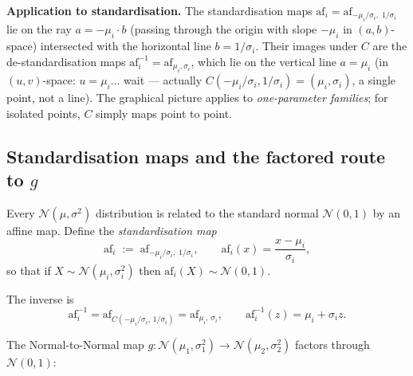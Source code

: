 \documentclass[11pt,a4paper]{article}
\newcommand{\N}{\mathcal{N}}
\begin{document}
\noindent\textbf{Application to standardisation.}
The standardisation maps $\mathrm{af}_i = \mathrm{af}_{-\mu_i/\sigma_i,\;1/\sigma_i}$ lie
on the ray $a = -\mu_i \cdot b$ (passing through the origin with slope $-\mu_i$ in
$(a,b)$-space) intersected with the horizontal line $b = 1/\sigma_i$.
Their images under $C$ are the de-standardisation maps
$\mathrm{af}_i^{-1} = \mathrm{af}_{\mu_i,\sigma_i}$, which lie on the vertical line $a=\mu_i$
(in $(u,v)$-space: $u=\mu_i$... wait — actually $C(-\mu_i/\sigma_i, 1/\sigma_i)=
(\mu_i, \sigma_i)$, a single point, not a line).
The graphical picture applies to \emph{one-parameter families}; for isolated points,
$C$ simply maps point to point.

\subsection{Standardisation maps and the factored route to $g$}
\label{sec:standardisation}

Every $\N(\mu,\sigma^2)$ distribution is related to the standard normal $\N(0,1)$ by an
affine map.  Define the \emph{standardisation map}
\[
  \mathrm{af}_i \;:=\; \mathrm{af}_{-\mu_i/\sigma_i,\;1/\sigma_i},
  \qquad
  \mathrm{af}_i(x) = \frac{x-\mu_i}{\sigma_i},
\]
so that if $X\sim\N(\mu_i,\sigma_i^2)$ then $\mathrm{af}_i(X)\sim\N(0,1)$.

The inverse is
\[
  \mathrm{af}_i^{-1} = \mathrm{af}_{C(-\mu_i/\sigma_i,\,1/\sigma_i)}
                     = \mathrm{af}_{\mu_i,\,\sigma_i},
  \qquad
  \mathrm{af}_i^{-1}(z) = \mu_i + \sigma_i z.
\]

The Normal-to-Normal map $g:\N(\mu_1,\sigma_1^2)\to\N(\mu_2,\sigma_2^2)$ factors through
$\N(0,1)$:
\medskip
\begin{center}
\end{center}
\medskip
\end{document}
